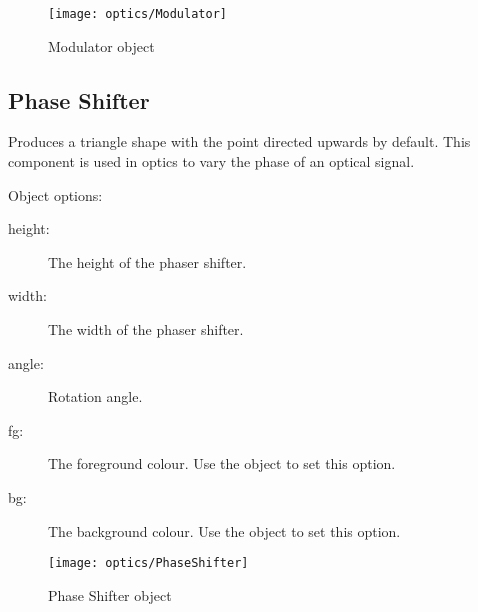 \begin{figure}[ht]
\centerline{\texttt{[image: optics/Modulator]}}
\caption{Modulator object}
\label{fig:modulator}
\end{figure}

\subsection{Phase Shifter}

Produces a triangle shape with the point directed upwards by default.  This
component is used in optics to vary the phase of an optical signal.

Object options:
\begin{description}
\item[height:] The height of the phaser shifter.
\item[width:] The width of the phaser shifter.
\item[angle:] Rotation angle.
\item[fg:] The foreground colour.  Use the  object to set this
option.
\item[bg:] The background colour.  Use the  object to set this
option.
\end{description}

\begin{figure}[ht]
\centerline{\texttt{[image: optics/PhaseShifter]}}
\caption{Phase Shifter object}
\label{fig:phase_shifter}
\end{figure}

